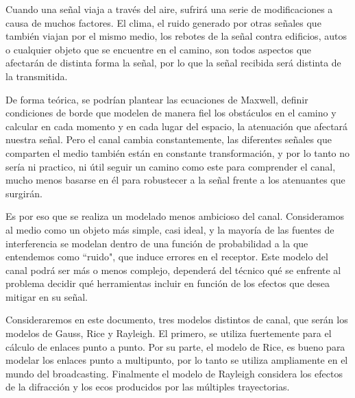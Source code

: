 Cuando una señal viaja a través del aire, sufrirá una serie de modificaciones a causa de muchos factores. El clima, el ruido generado por otras señales que también viajan por el mismo medio, los rebotes de la señal contra edificios, autos o cualquier objeto que se encuentre en el camino, son todos aspectos que afectarán de distinta forma la señal, por lo que la señal recibida será distinta de la transmitida. 

De forma teórica, se podrían plantear las ecuaciones de Maxwell, definir condiciones de borde que modelen de manera fiel los obstáculos en el camino y calcular en cada momento y en cada lugar del espacio, la atenuación que afectará nuestra señal. Pero el canal cambia constantemente, las diferentes señales que comparten el medio también están en constante transformación, y por lo tanto no sería ni practico, ni útil seguir un camino como este para comprender el canal, mucho menos basarse en él para robustecer a la señal frente a los atenuantes que surgirán. 

Es por eso que se realiza un modelado menos ambicioso del canal. Consideramos al medio como un objeto más simple, casi ideal, y la mayoría de las fuentes de interferencia se modelan dentro de una función de probabilidad a la que entendemos como ``ruido", que induce errores en el receptor. Este modelo del canal podrá ser más o menos complejo, dependerá del técnico qué se enfrente al problema decidir qué herramientas incluir en función de los efectos que desea mitigar en su señal.
	
Consideraremos en este documento, tres modelos distintos de canal, que serán los modelos de Gauss, Rice y Rayleigh. El primero, se utiliza fuertemente para el cálculo de enlaces punto a punto. Por su parte, el modelo de Rice, es bueno para modelar los enlaces punto a multipunto, por lo tanto se utiliza ampliamente en el mundo del broadcasting. Finalmente el modelo de Rayleigh considera los efectos de la difracción y los ecos producidos por las múltiples trayectorias.


